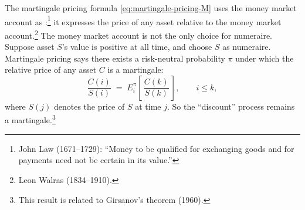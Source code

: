 
The martingale pricing formula \eqref{eq:martingale-pricing-M} uses the money market account as :\footnote{John Law (1671--1729): ``Money to be qualified for exchanging goods and for payments need not be certain in its value.''} it expresses the price of any asset relative to the money market account.\footnote{Leon Walras (1834--1910).}
The money market account is not the only choice for numeraire.
Suppose asset $S$'s value is positive at all time, and choose $S$ as numeraire.
Martingale pricing says there exists a risk-neutral probability $\pi$ under which the relative price of any asset $C$ is a martingale:
\[
	\frac{C(i)}{S(i)} \;=\; E_{i}^{\pi}\left[\,\frac{C(k)}{S(k)}\,\right] , \qquad i\le k ,
\]
where $S(j)$ denotes the price of $S$ at time $j$.
So the ``discount'' process remains a martingale.\footnote{This result is related to Girsanov's theorem (1960).}

\suppstart
{}
\suppend


